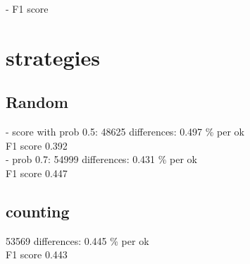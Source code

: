 \documentclass[preprint,12pt]{elsarticle}
\begin{document}
- F1 score

\section{strategies}
\label{strategy:1}

\subsection{Random}

- score with prob 0.5:
48625 differences: 0.497 \% per ok \\
F1 score 0.392 \\

- prob 0.7:
54999 differences: 0.431 \% per ok \\
F1 score 0.447

\subsection{counting}

53569 differences: 0.445 \% per ok \\
F1 score 0.443









\end{document}
